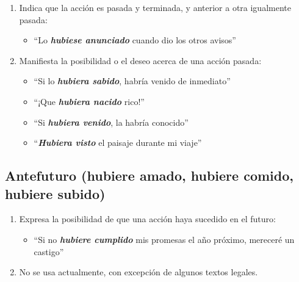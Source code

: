 \documentclass[14pt]{extarticle}
\newcommand{\marcatexto}[1]{\textbf{\textit{#1}}}
\begin{document}
\begin{enumerate}[label=\alph*)]
\item Indica que la acción es pasada y terminada, y anterior a otra igualmente pasada:
\begin{itemize}
\item \enquote{Lo \marcatexto{hubiese anunciado} cuando dio los otros avisos}
\end{itemize}
\item Manifiesta la posibilidad o el deseo acerca de una acción pasada:
\begin{itemize}
\item \enquote{Si lo \marcatexto{hubiera sabido}, habría venido de inmediato}
\item \enquote{¡Que \marcatexto{hubiera nacido} rico!}
\item \enquote{Si \marcatexto{hubiera venido}, la habría conocido}
\item \enquote{\marcatexto{Hubiera visto} el paisaje durante mi viaje}
\end{itemize}
\end{enumerate}

\subsection{Antefuturo (hubiere amado, hubiere comido, hubiere subido)}

\begin{enumerate}[label=\alph*)]
\item Expresa la posibilidad de que una acción haya sucedido en el futuro:
\begin{itemize}
\item \enquote{Si no \marcatexto{hubiere cumplido} mis promesas el año próximo, mereceré un castigo}
\end{itemize}
\item No se usa actualmente, con excepción de algunos textos legales.
\end{enumerate}
\end{document}
